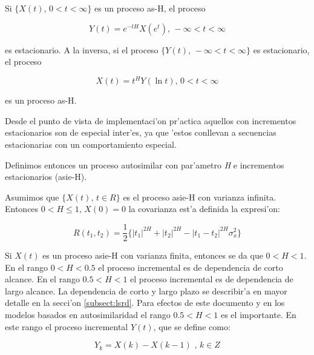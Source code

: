 \begin{teorema} \label{teo:tiposestacionarios}
Si $\{X(t) \text{, } 0 < t < \infty \}$ es un proceso as-H, el proceso

\begin{equation} \label{eq:tipoestacionarios1}
Y(t) = e^{-tH}X(e^t) \text{, } - \infty < t < \infty
\end{equation}

es estacionario. A la inversa, si el proceso
$\{ Y(t) \text{, } -\infty < t < \infty \}$ es estacionario, el proceso

\begin{equation} \label{eq:tipoestacionario2}
X(t) = t^HY(\ln t) \text{, } 0 < t < \infty
\end{equation}

es un proceso as-H.
\end{teorema}

Desde el punto de vista de implementaci'on pr'actica aquellos con incrementos
estacionarios son de especial inter'es, ya que 'estos conllevan a secuencias
estacionarias con un comportamiento especial.

Definimos entonces un proceso autosimilar con par'ametro {\it H} e 
incrementos estacionarios (asie-H).

\begin{lema} \label{lem:correlation}
Asumimos que $\{X(t) \text{, } t \in R \}$ es el proceso asie-H con
varianza infinita. Entonces $ 0 < H \le 1 \text{, } X(0) = 0$ la covarianza
est'a definida la expresi'on:

\begin{equation} \label{eq:correlation1}
R(t_1,t_2) = \frac{1}{2} \{ |t_1|^{2H} + |t_2|^{2H} - |t_1 - t_2|^{2H} \sigma_{x}^{2} \}
\end{equation}
\end{lema}

Si $X(t)$ es un proceso asie-H con varianza finita, entonces se da que
$0 < H < 1$.  En el rango $0 < H < 0.5$ el proceso incremental es de 
dependencia de corto alcance. En el rango $0.5 < H < 1$ el proceso incremental 
es de dependencia de largo alcance.  La dependencia de corto y largo plazo se
describir'a en mayor detalle en la secci'on \ref{subsect:lsrd}. Para efectos de
este documento y en los modelos basados en autosimilaridad el rango
$0.5 < H < 1$ es el importante. En este rango el proceso incremental $Y(t)$, que
se define como:

\begin{equation} \label{eq:correlation2}
Y_k = X(k) - X(k -1) \text{ ,  } k \in Z
\end{equation}

